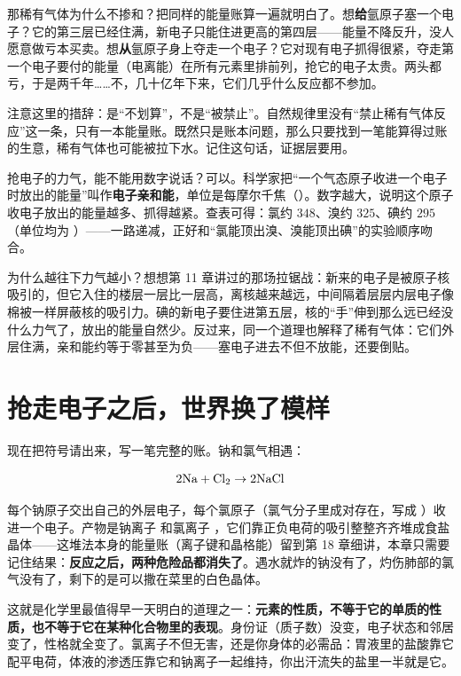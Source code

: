 那稀有气体为什么不掺和？把同样的能量账算一遍就明白了。想\textbf{给}氩原子塞一个电子？它的第三层已经住满，新电子只能住进更高的第四层——能量不降反升，没人愿意做亏本买卖。想\textbf{从}氩原子身上夺走一个电子？它对现有电子抓得很紧，夺走第一个电子要付的能量（电离能）在所有元素里排前列，抢它的电子太贵。两头都亏，于是两千年……不，几十亿年下来，它们几乎什么反应都不参加。

注意这里的措辞：是“不划算”，不是“被禁止”。自然规律里没有“禁止稀有气体反应”这一条，只有一本能量账。既然只是账本问题，那么只要找到一笔能算得过账的生意，稀有气体也可能被拉下水。记住这句话，证据层要用。

\begin{qiaoliang}
抢电子的力气，能不能用数字说话？可以。科学家把“一个气态原子收进一个电子时放出的能量”叫作\textbf{电子亲和能}，单位是每摩尔千焦（）。数字越大，说明这个原子收电子放出的能量越多、抓得越紧。查表可得：氯约 $348$、溴约 $325$、碘约 $295$（单位均为 ）——一路递减，正好和“氯能顶出溴、溴能顶出碘”的实验顺序吻合。

为什么越往下力气越小？想想第 11 章讲过的那场拉锯战：新来的电子是被原子核吸引的，但它入住的楼层一层比一层高，离核越来越远，中间隔着层层内层电子像棉被一样屏蔽核的吸引力。碘的新电子要住进第五层，核的“手”伸到那么远已经没什么力气了，放出的能量自然少。反过来，同一个道理也解释了稀有气体：它们外层住满，亲和能约等于零甚至为负——塞电子进去不但不放能，还要倒贴。
\end{qiaoliang}

\section{抢走电子之后，世界换了模样}

现在把符号请出来，写一笔完整的账。钠和氯气相遇：

\[\mathrm{2Na} + \mathrm{Cl_2} \rightarrow \mathrm{2NaCl}\]

每个钠原子交出自己的外层电子，每个氯原子（氯气分子里成对存在，写成 ）收进一个电子。产物是钠离子  和氯离子 ，它们靠正负电荷的吸引整整齐齐堆成食盐晶体——这堆法本身的能量账（离子键和晶格能）留到第 18 章细讲，本章只需要记住结果：\textbf{反应之后，两种危险品都消失了}。遇水就炸的钠没有了，灼伤肺部的氯气没有了，剩下的是可以撒在菜里的白色晶体。

这就是化学里最值得早一天明白的道理之一：\textbf{元素的性质，不等于它的单质的性质，也不等于它在某种化合物里的表现}。身份证（质子数）没变，电子状态和邻居变了，性格就全变了。氯离子不但无害，还是你身体的必需品：胃液里的盐酸靠它配平电荷，体液的渗透压靠它和钠离子一起维持，你出汗流失的盐里一半就是它。

